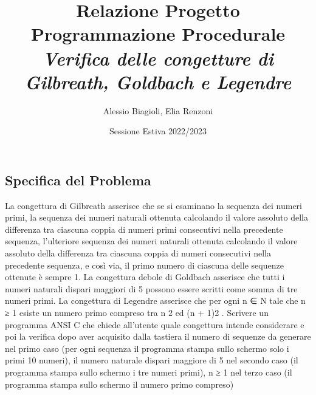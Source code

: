 \documentclass{article}
\title{\bfseries Relazione Progetto Programmazione Procedurale \\\itshape Verifica delle congetture di Gilbreath, Goldbach e Legendre }
\author{Alessio Biagioli, Elia Renzoni}
\date{Sessione Estiva 2022/2023}
\begin{document}
\maketitle
\newpage

\begin{center}
\section{Specifica del Problema}
\end{center}


\large
La congettura di Gilbreath asserisce che se si esaminano la sequenza dei numeri primi, la sequenza dei numeri naturali ottenuta calcolando il valore assoluto della differenza tra ciascuna coppia di numeri primi consecutivi nella precedente sequenza, l’ulteriore sequenza dei numeri naturali ottenuta calcolando il valore assoluto della differenza tra ciascuna coppia di numeri consecutivi nella precedente sequenza, e così via, il primo numero di ciascuna delle sequenze ottenute è sempre 1. La congettura debole di Goldbach asserisce che tutti i numeri naturali dispari maggiori di 5 possono essere scritti come somma di tre numeri primi. La congettura di Legendre asserisce che per ogni n ∈ N tale che n ≥ 1 esiste un numero primo compreso tra n 2 ed (n + 1)2 . Scrivere un programma ANSI C che chiede all’utente quale congettura intende considerare e poi la verifica dopo aver acquisito dalla tastiera il numero di sequenze da generare nel primo caso (per ogni sequenza il programma stampa sullo schermo solo i primi 10 numeri), il numero naturale dispari maggiore di 5 nel secondo caso (il programma stampa sullo schermo i tre numeri primi), n ≥ 1 nel terzo caso (il programma stampa sullo schermo il numero primo compreso)

\end{document}
